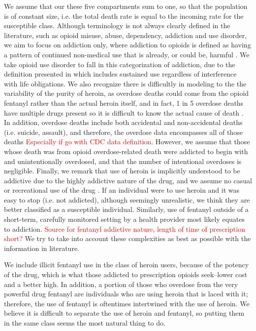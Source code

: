 \documentclass[12pt]{article}
\begin{document}
We assume that our these five compartments sum to one, so that the population is of constant size, i.e. the total death rate is equal to the incoming rate for the susceptible class. Although terminology is not always clearly defined in the literature, such as opioid misuse, abuse, dependency, addiction and use disorder, we aim to focus on addiction only, where addiction to opioids is defined as having a pattern of continued non-medical use that is already, or could be, harmful \cite{Vowles}. We take opioid use disorder to fall in this categorization of addiction, due to the definition presented in \cite{SAMSHA2} which includes sustained use regardless of interference with life obligations. We also recognize there is difficultly in modeling to the the variability of the purity of heroin, as overdose deaths could come from the opioid fentanyl rather than the actual heroin itself, and in fact, 1 in 5 overdose deaths have multiple drugs present so it is difficult to know the actual cause of death \cite{CDC4}. In addition, overdose deaths include both accidental and non-accidental deaths (i.e. suicide, assault), and therefore, the overdose data encompasses all of those deaths \textcolor{red}{Especially if go with CDC data definition}.
However, we assume that those whose death was from opioid overdose-related death were addicted to begin with and unintentionally overdosed, and that the number of intentional overdoses is negligible. Finally, we remark that use of heroin is implicitly understood to be addictive due to the highly addictive nature of the drug, and we assume no casual or recreational use of the drug \cite{NIH1}. If an individual were to use heroin and it was easy to stop (i.e. not addicted), although seemingly unrealistic, we think they are better classified as a susceptible individual. Similarly, use of fentanyl outside of a short-term, carefully monitored setting by a health provider most likely equates to addiction. \textcolor{red}{Source for fentanyl addictive nature, length of time of prescription short?} We try to take into account these complexities as best as possible with the information in literature.

We include illicit fentanyl use in the class of heroin users, because of the potency of the drug, which is what those addicted to prescription opioids seek--lower cost and a better high. In addition, a portion of those who overdose from the very powerful drug fentanyl are individuals who are using heroin that is laced with it; therefore, the use of fentanyl is oftentimes intertwined with the use of heroin. We believe it is difficult to separate the use of heroin and fentanyl, so putting them in the same class seems the most natural thing to do. 
\end{document}
